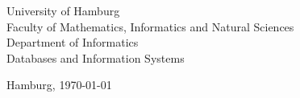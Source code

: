 \begin{titlepage}
	\vspace{0.5cm}

	\begin{center}
		\vfill
		
		University of Hamburg\\
		Faculty of Mathematics, Informatics and Natural Sciences\\
		Department of Informatics\\
		Databases and Information Systems
		
		\vspace{1cm}
		
		Hamburg, \today
	\end{center}
\end{titlepage}

\restoregeometry